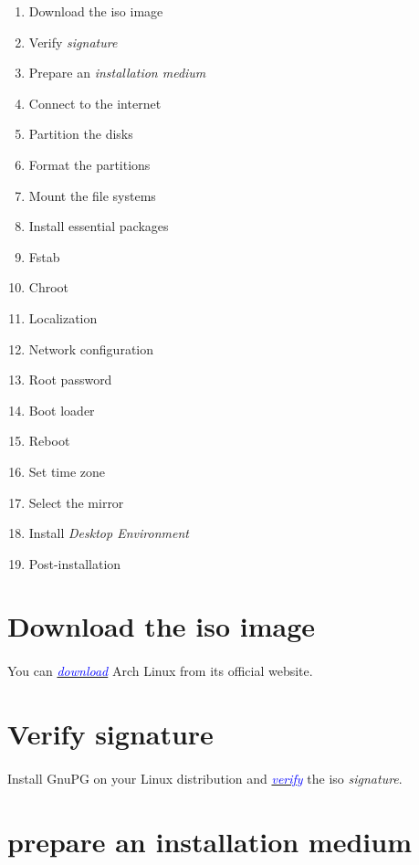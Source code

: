\documentclass[12pt, a4paper]{article}
\begin{document}
\newpage
\begin{enumerate}
	\item Download the iso image
	\item Verify \emph{signature}
	\item Prepare an \emph{installation medium}
	\item Connect to the internet
	\item Partition the disks
	\item Format the partitions
	\item Mount the file systems
	\item Install essential packages
	\item Fstab
	\item Chroot
	\item Localization
	\item Network configuration
	\item Root password
	\item Boot loader
	\item Reboot
	\item Set time zone
	\item Select the mirror
	\item Install \emph{Desktop Environment}
	\item Post-installation
\end{enumerate}

\newpage
\section{Download the iso image}
\paragraph{} 
You can  \href{https://archlinux.org/download/}{\textcolor{blue}{\emph{download}}} Arch Linux from its official website.

\section{Verify signature}
\paragraph{}
 Install GnuPG on your Linux distribution and \href{https://wiki.archlinux.org/index.php/Installation_guide#Verify_signature}{\textcolor{blue}{\emph{verify}}} the iso \emph{signature}.

\section{prepare an installation medium}
\end{document}
